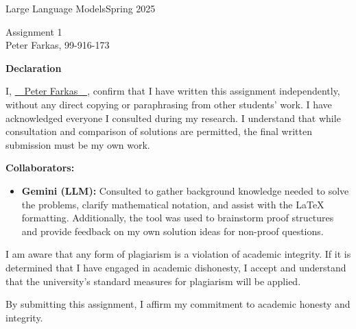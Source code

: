 \documentclass[a4paper,12pt]{ETHexercise}
\begin{document}
{\Large Large Language Models}{Spring 2025}

\vspace{5mm}
\begin{center}
    {\Huge Assignment 1 \\ \vspace{5mm} \Large Peter Farkas, 99-916-173}\\
\end{center}

\vspace{3cm}

\begin{center}
    {\large \textbf{Declaration}}
\end{center}

I, \textcolor{ETHGreen}{{\cursive\setul{0.1ex}{}\ul{~~Peter Farkas~~}}}, confirm that I have written this assignment independently, without any direct copying or paraphrasing from other students' work. 
I have acknowledged everyone I consulted during my research. 
I understand that while consultation and comparison of solutions are permitted, the final written submission must be my own work.

\textbf{Collaborators:}
\begin{itemize}
\item \textbf{Gemini (LLM):} Consulted to gather background knowledge needed to solve the problems, clarify mathematical notation, and assist with the \LaTeX{} formatting. Additionally, the tool was used to brainstorm proof structures and provide feedback on my own solution ideas for non-proof questions.
\end{itemize}

I am aware that any form of plagiarism is a violation of academic integrity. If it is determined that I have engaged in academic dishonesty, I accept and understand that the university's standard measures for plagiarism will be applied.

By submitting this assignment, I affirm my commitment to academic honesty and integrity.

\newpage

%


\newpage


\newpage


\newpage


\newpage


\newpage
\end{document}
